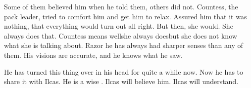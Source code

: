 Some of them believed him when he told them, others did not. 
Countess, the pack leader, tried to comfort him and get him to relax. 
Assured him that it was nothing, that everything would turn out all right. 
But then, she would. 
She always does that. 
Countess means well\dash she always does\dash but she does not know what she is talking about. 
Razor he has always had sharper senses than any of them. 
His visions are accurate, and he knows what he saw. 

He has turned this thing over in his head for quite a while now. 
Now he has to share it with Ilcas. 
He is a wise \scatha. 
Ilcas will believe him. 
Ilcas will understand. 









